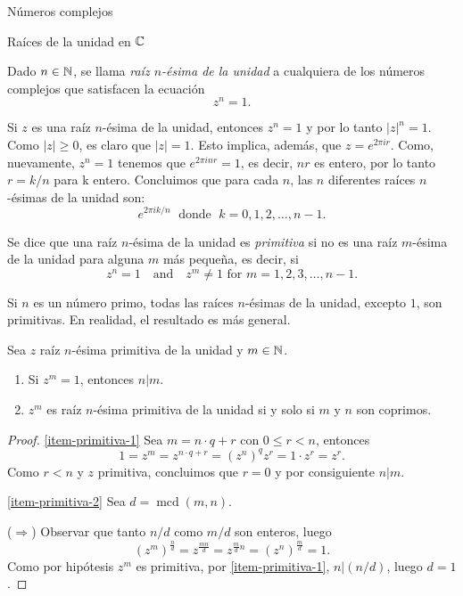 \begin{chapter}{N\'umeros complejos}
\begin{section}{Raíces de la unidad en $\mathbb C$}

    \begin{definicion}
        Dado $n \in \mathbb N$, se llama \textit{raíz $n$-ésima de la unidad} a cualquiera de los números complejos que satisfacen la ecuación
        $$
            z^n = 1.
        $$
    \end{definicion}

    Si $z$  es una raíz $n$-ésima de la unidad,  entonces $z^n=1$ y por lo tanto $|z|^n = 1$. Como $|z|\ge 0$,  es claro que  $|z|=1$. Esto implica, además,  que $z =  e^{2 \pi i r}$. Como, nuevamente,   $z^n=1$ tenemos que $ e^{2 \pi i nr}=1$,  es decir,  $nr$ es entero, por lo tanto $r = k/n$ para k  entero. Concluimos que para cada $n$, las $n$ diferentes raíces $n$-ésimas de la unidad son:
    $$
        e^{2 \pi i k/n} \;\text{ donde }\;  k = 0, 1, 2, \ldots, n-1.
    $$

    Se dice que una raíz $n$-ésima de la unidad es \textit{primitiva} si no es una raíz $m$-ésima de la unidad para alguna $m$ más pequeña, es decir, si
    $$
        z^{n}=1\quad \text{and}\quad z^{m}\neq 1\text{ for } m=1,2,3,\ldots ,n-1.
    $$

    Si $n$ es un número primo, todas las raíces $n$-ésimas de la unidad, excepto $1$, son primitivas. En  realidad,  el resultado es más general.

    \begin{proposicion}
        Sea $z$ raíz $n$-ésima primitiva de la unidad y $m \in \mathbb N$.
        \begin{enumerate}
            \item\label{item-primitiva-1} Si $z^m=1$,  entonces $n|m$.
            \item\label{item-primitiva-2} $z^m$  es raíz $n$-ésima primitiva de la unidad si y solo si $m$ y $n$  son coprimos.
        \end{enumerate}

    \end{proposicion}
    \begin{proof}
        \ref{item-primitiva-1} Sea $m = n\cdot q + r$ con $0 \le r < n$, entonces $$1 = z^m = z^{n\cdot q + r} = (z^{n})^qz^r = 1 \cdot z^r = z^r.$$ Como $r<n$ y $z$ primitiva, concluimos que $r=0$ y por consiguiente $n|m$.

        \ref{item-primitiva-2} Sea $d = \operatorname{mcd}(m, n)$.

        ($\Rightarrow$) Observar que tanto $n/d$ como $m/d$ son enteros, luego
        $$
            (z^m)^{\frac{n}{d}} = z^{\frac{mn}{d}} = z^{\frac{m}{d}n} = (z^n)^{\frac{m}{d}} = 1.
        $$
        Como por hipótesis $z^m$ es primitiva, por \ref{item-primitiva-1}, $n | (n/d)$, luego $d=1$.


\end{proof}
\end{section}
\end{chapter}

